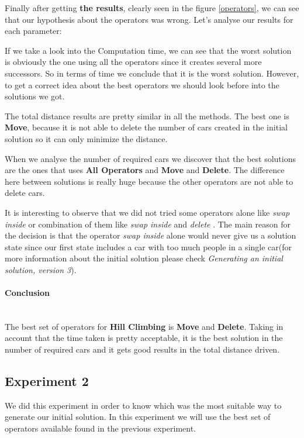 \documentclass[12]{article}
\begin{document}
Finally after getting \textbf{the results}, clearly seen in the figure \ref{operators}, we can see that our hypothesis about the operators was wrong. Let's analyse our results for each parameter: 
\\
\smallskip

If we take a look into the Computation time, we can see that the worst solution is obviously the one using all the operators since it creates several more successors. So in terms of time we conclude that it is the worst solution. However, to get a correct idea about the best operators we should look before into the solutions we got. 
\\
\smallskip

The total distance results are pretty similar in all the methods. The best one is \textbf{Move}, because it is not able to delete the number of cars created in the initial solution so it can only minimize the distance.  
\\
\smallskip

When we analyse the number of required cars we discover that the best solutions are the ones that uses \textbf{All Operators} and \textbf{Move} and \textbf{Delete}. The difference here between solutions is really huge because the other operators are not  able to delete cars. 


It is interesting to observe that we did not tried some operators alone like \textit{swap inside} or combination of them like \textit{swap inside} and \textit{delete} . The main reason for the decision is that the operator \textit{swap inside} alone would never give us a solution state since our first state includes a car with too much people in a single car(for more information about the initial solution please check \textit{Generating an initial solution, version 3}). 
\\
\smallskip

\paragraph{Conclusion}\mbox{}\\
The best set of operators for \textbf{Hill Climbing} is \textbf{Move} and \textbf{Delete}. Taking in account that the time taken is pretty acceptable, it is the best solution in the number of required cars and it gets good results in the total distance driven.

\subsection{Experiment 2}
We did this experiment in order to know which was the most suitable way to generate our initial solution. In this experiment we will use the best set of operators available found in the previous experiment.
\end{document}
